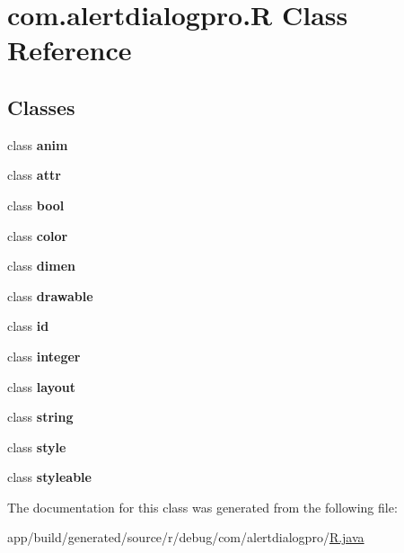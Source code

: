 \hypertarget{classcom_1_1alertdialogpro_1_1_r}{}\section{com.\+alertdialogpro.\+R Class Reference}
\label{classcom_1_1alertdialogpro_1_1_r}
\subsection*{Classes}
\begin{DoxyCompactItemize}
\item 
class {\bfseries anim}
\item 
class {\bfseries attr}
\item 
class {\bfseries bool}
\item 
class {\bfseries color}
\item 
class {\bfseries dimen}
\item 
class {\bfseries drawable}
\item 
class {\bfseries id}
\item 
class {\bfseries integer}
\item 
class {\bfseries layout}
\item 
class {\bfseries string}
\item 
class {\bfseries style}
\item 
class {\bfseries styleable}
\end{DoxyCompactItemize}


The documentation for this class was generated from the following file\+:\begin{DoxyCompactItemize}
\item 
app/build/generated/source/r/debug/com/alertdialogpro/\hyperlink{app_2build_2generated_2source_2r_2debug_2com_2alertdialogpro_2_r_8java}{R.\+java}\end{DoxyCompactItemize}
